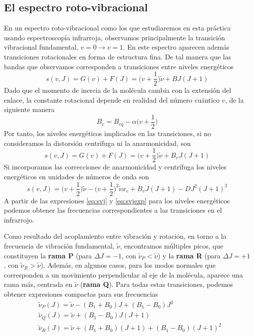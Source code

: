 \documentclass{tufte-book}
\begin{document}
\subsection{El espectro roto-vibracional}
En un espectro roto-vibracional como los que estudiaremos en
esta práctica usando espectroscopía infrarroja, observamos 
principalmente la transición vibracional fundamental, 
$v=0\rightarrow v=1$. En este espectro aparecen además 
transiciones rotacionales en forma de estructura fina. De
tal manera que las bandas que observamos corresponden 
a transiciones entre niveles energéticos 
\begin{equation}
    s(v, J) = G(v) + F(J) = \Big(v+\frac{1}{2}\Big)\tilde{\nu} + BJ(J+1)
\end{equation}
Dado que el momento de inercia de la molécula cambia con la extensión
del enlace, la constante rotacional depende en realidad del número
cuántico $v$, de la siguiente manera
\begin{equation}
B_v = B_{eq} - \alpha\bigg(v+\frac{1}{2}\bigg)
\end{equation}
Por tanto, los niveles energéticos implicados en las transiciones, si no 
consideramos la distorsión centrífuga ni la anarmonicidad, son
\begin{equation}
    s(v, J) = G(v) + F(J) = \Big(v+\frac{1}{2}\Big)\tilde{\nu} + B_vJ(J+1)
    \label{eq:svj}
\end{equation}
Si incorporamos las correcciones de anarmonicidad y centrífuga
los niveles energéticos en unidades de números de onda son
\begin{equation}
    s(v, J) = \Big(v+\frac{1}{2}\Big)\tilde{\nu} - \Big(v+\frac{1}{2}\Big)^2\tilde{\nu}x_e + B_vJ(J+1)-DJ^2(J+1)^2
\label{eq:svjexp}
\end{equation}
A partir de las expresiones \ref{eq:svj} y \ref{eq:svjexp} para 
los niveles energéticos podemos obtener las frecuencias correspondientes
a las transiciones en el infrarrojo. 

Como resultado del acoplamiento entre vibración y rotación, en torno a
la frecuencia de vibración fundamental, $\tilde{\nu}$, encontramos 
múltiples picos, que constituyen la \textbf{rama P} (para $\Delta J=-1$, 
con $\tilde{\nu}_P<\tilde{\nu}$) y la \textbf{rama R} (para 
$\Delta J=+1$, con $\tilde{\nu}_R>\tilde{\nu}$). Además, en 
algunos casos, para los modos normales que corresponden a un 
movimiento perpendicular al eje de la molécula, aparece una rama 
más, centrada en $\tilde{\nu}$ (\textbf{rama Q}). Para todas estas
transiciones, podemos obtener expresiones compactas para sus 
frecuencias
\begin{align}
    &\tilde{\nu}_P(J)=\tilde{\nu} - (B_1+B_0)J + (B_1-B_0)J^2 \label{eq:nuP}\\
    &\tilde{\nu}_Q(J)=\tilde{\nu} + (B_1-B_0)J(J+1) \label{eq:nuQ}\\
    &\tilde{\nu}_R
    (J)=\tilde{\nu} + (B_1+B_0)(J+1) + (B_1-B_0)(J+1)^2 \label{eq:nuR}
\end{align}
\end{document}
